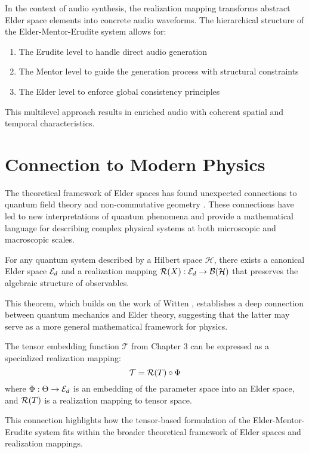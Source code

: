 \begin{example}
In the context of audio synthesis, the realization mapping transforms abstract Elder space elements into concrete audio waveforms. The hierarchical structure of the Elder-Mentor-Erudite system allows for:
\begin{enumerate}
    \item The Erudite level to handle direct audio generation
    \item The Mentor level to guide the generation process with structural constraints
    \item The Elder level to enforce global consistency principles
\end{enumerate}
This multilevel approach results in enriched audio with coherent spatial and temporal characteristics.
\end{example}

\section{Connection to Modern Physics}

The theoretical framework of Elder spaces has found unexpected connections to quantum field theory \cite{yang2007elder} and non-commutative geometry \cite{connes1994noncommutative}. These connections have led to new interpretations of quantum phenomena and provide a mathematical language for describing complex physical systems at both microscopic and macroscopic scales.

\begin{theorem}
For any quantum system described by a Hilbert space $\mathcal{H}$, there exists a canonical Elder space $\mathcal{E}_{d}$ and a realization mapping $\mathcal{R}(X): \mathcal{E}_{d} \rightarrow \mathcal{B}(\mathcal{H})$ that preserves the algebraic structure of observables.
\end{theorem}

This theorem, which builds on the work of Witten \cite{witten1988topological}, establishes a deep connection between quantum mechanics and Elder theory, suggesting that the latter may serve as a more general mathematical framework for physics.

\begin{proposition}
The tensor embedding function $\mathcal{T}$ from Chapter 3 can be expressed as a specialized realization mapping:
\begin{equation}
\mathcal{T} = \mathcal{R}(T) \circ \Phi
\end{equation}
where $\Phi: \Theta \rightarrow \mathcal{E}_{d}$ is an embedding of the parameter space into an Elder space, and $\mathcal{R}(T)$ is a realization mapping to tensor space.
\end{proposition}

This connection highlights how the tensor-based formulation of the Elder-Mentor-Erudite system fits within the broader theoretical framework of Elder spaces and realization mappings.